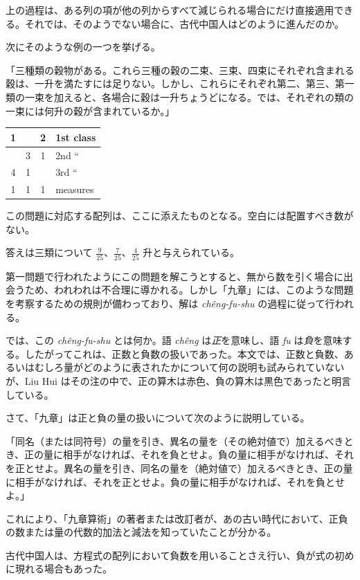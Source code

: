 \documentclass[11pt]{article}
\newcommand{\scanpage}[2]{\clearpage\setcounter{footnote}{0}\noindent{\footnotesize\color{gray}PDF #1 頁 · #2}\par\medskip}
\newcommand{\scanfooter}{}
\newcommand{\fangtableE}{\begin{tabular}{|c|c|c|l|}\hline 1&&2&1st class\\\hline &3&1&2nd ``\\\hline 4&1&&3rd ``\\\hline 1&1&1&measures\\\hline\end{tabular}}
\begin{document}
上の過程は、ある列の項が他の列からすべて減じられる場合にだけ直接適用できる。それでは、そのようでない場合に、古代中国人はどのように進んだのか。

次にそのような例の一つを挙げる。

「三種類の穀物がある。これら三種の穀の二束、三束、四束にそれぞれ含まれる穀は、一升を満たすには足りない。しかし、これらにそれぞれ第二、第三、第一類の一束を加えると、各場合に穀は一升ちょうどになる。では、それぞれの類の一束には何升の穀が含まれているか。」

\begin{center}
\begin{minipage}{0.58\linewidth}
\centering\fangtableE
\end{minipage}\hfill
\begin{minipage}{0.36\linewidth}
\raggedright
この問題に対応する配列は、ここに添えたものとなる。空白には配置すべき数がない。
\end{minipage}
\end{center}

答えは三類について $\frac9{25}$、$\frac7{25}$、$\frac4{25}$ 升と与えられている。

第一問題で行われたようにこの問題を解こうとすると、無から数を引く場合に出会うため、われわれは不合理に導かれる。しかし「九章」には、このような問題を考察するための規則が備わっており、解は \emph{chêng-fu-shu} の過程に従って行われる。

では、この \emph{chêng-fu-shu} とは何か。語 \emph{chêng} は\emph{正}を意味し、語 \emph{fu} は\emph{負}を意味する。したがってこれは、正数と負数の扱いであった。本文では、正数と負数、あるいはむしろ量がどのように表されたかについて何の説明も試みられていないが、Liu Hui はその注の中で、正の算木は赤色、負の算木は黒色であったと明言している。

さて、「九章」は正と負の量の扱いについて次のように説明している。
\scanfooter

\scanpage{0035}{第三章、印刷頁21}
「同名（または同符号）の量を引き、異名の量を（その絶対値で）加えるべきとき、正の量に相手がなければ、それを負とせよ。負の量に相手がなければ、それを正とせよ。異名の量を引き、同名の量を（絶対値で）加えるべきとき、正の量に相手がなければ、それを正とせよ。負の量に相手がなければ、それを負とせよ。」

これにより、「九章算術」の著者または改訂者が、あの古い時代において、正負の数または量の代数的加法と減法を知っていたことが分かる。

古代中国人は、方程式の配列において負数を用いることさえ行い、負が式の初めに現れる場合もあった。
\end{document}
